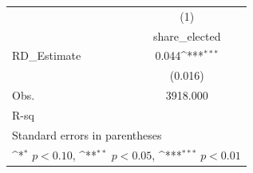 \begin{table}[htbp]\centering
\def\sym#1{\ifmmode^{#1}\else\(^{#1}\)\fi}
\begin{tabular}{l*{1}{c}}
\toprule
                    &\multicolumn{1}{c}{(1)}\\
                    &\multicolumn{1}{c}{share\_elected}\\
\midrule
RD\_Estimate         &       0.044\sym{***}\\
                    &     (0.016)         \\
\midrule
Obs.                &    3918.000         \\
R-sq                &                     \\
\bottomrule
\multicolumn{2}{l}{\footnotesize Standard errors in parentheses}\\
\multicolumn{2}{l}{\footnotesize \sym{*} \(p<0.10\), \sym{**} \(p<0.05\), \sym{***} \(p<0.01\)}\\
\end{tabular}
\end{table}
